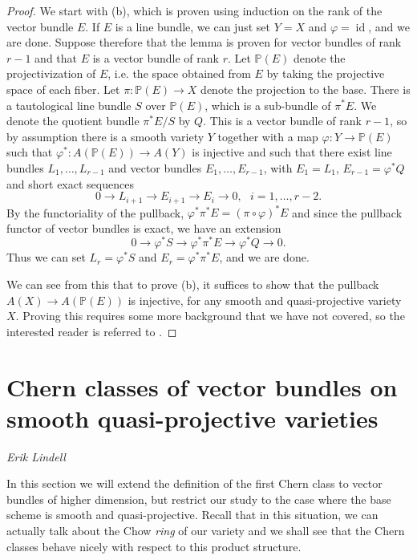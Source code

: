 \documentclass[a4paper,openany]{scrbook}
\newcommand{\chapterauthor}[1]{\hfill\emph{#1}\par\noindent}
\begin{document}
\begin{proof}

We start with (b), which is proven using induction on the rank of the vector bundle $E$. If $E$ is a line bundle, we can just set $Y=X$ and $\varphi=\operatorname{id}$, and we are done. Suppose therefore that the lemma is proven for vector bundles of rank $r-1$ and that $E$ is a vector bundle of rank $r$. Let $\mathbb{P}(E)$ denote the projectivization of $E$, i.e. the space obtained from $E$ by taking the projective space of each fiber. Let $\pi:\mathbb{P}(E)\to X$ denote the projection to the base. There is a tautological line bundle $S$ over $\mathbb{P}(E)$, which is a sub-bundle of $\pi^*E$. We denote the quotient bundle $\pi^*E/S$ by $Q$. This is a vector bundle of rank $r-1$, so by assumption there is a smooth variety $Y$ together with a map $\varphi:Y\to\mathbb{P}(E)$ such that $\varphi^*:A(\mathbb{P}(E))\to A(Y)$ is injective and such that there exist line bundles $L_1,\ldots, L_{r-1}$ and vector bundles $E_1,\ldots, E_{r-1}$, with $E_1=L_1$, $E_{r-1}=\varphi^* Q$ and short exact sequences
$$0\to L_{i+1}\to E_{i+1}\to E_i\to 0,\ \ \ i=1,\ldots, r-2.$$
By the functoriality of the pullback, $\varphi^*\pi^*E=(\pi\circ\varphi)^*E$ and since the pullback functor of vector bundles is exact, we have an extension
$$0\longrightarrow\varphi^*S\longrightarrow\varphi^*\pi^*E\longrightarrow\varphi^*Q\longrightarrow 0.$$
Thus we can set $L_r=\varphi^*S$ and $E_r=\varphi^*\pi^* E$, and we are done.

We can see from this that to prove (b), it suffices to show that the pullback $A(X)\to A(\mathbb{P}(E))$ is injective, for any smooth and quasi-projective variety $X$. Proving this requires some more background that we have not covered, so the interested reader is referred to \cite[Chapter 3]{fulton:intersection-theory}.

\end{proof}


\section{Chern classes of vector bundles on smooth quasi-projective varieties}
\chapterauthor{Erik Lindell}

In this section we will extend the definition of the first Chern class to vector bundles of higher dimension, but restrict our study to the case where the base scheme is smooth and quasi-projective. Recall that in this situation, we can actually talk about the Chow \textit{ring} of our variety and we shall see that the Chern classes behave nicely with respect to this product structure.
\end{document}
